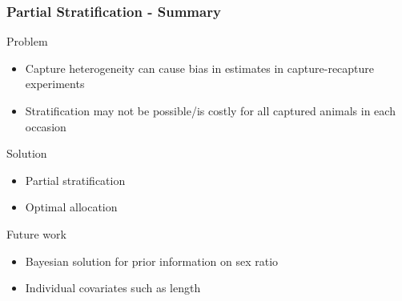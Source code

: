 \documentclass{beamer}
\begin{document}
\begin{frame} \frametitle{Partial Stratification - Summary}

Problem
\begin{itemize}
\item Capture heterogeneity can cause bias in estimates in capture-recapture experiments 
\item Stratification may not be possible/is costly for all captured animals in each occasion
\end{itemize}

Solution
\begin{itemize}
\item Partial stratification 
\item Optimal allocation 
\end{itemize}

Future work
\begin{itemize}
\item Bayesian solution for prior information on sex ratio
\item Individual covariates such as length
\end{itemize}
\end{frame}
\end{document}
